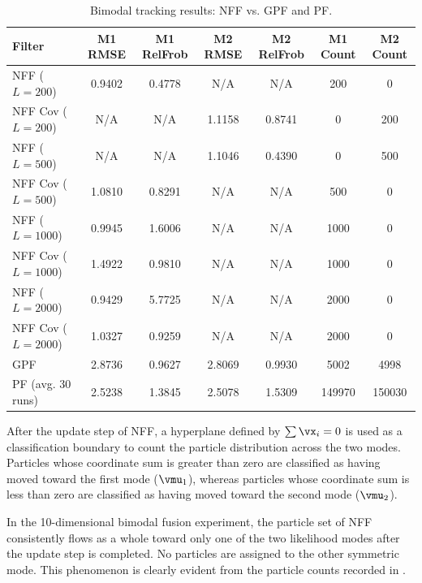 \begin{table}[ht]
	\footnotesize
	\setlength{\tabcolsep}{3pt}
	
	\begin{tabularx}{\textwidth}{|X|c|c|c|c|c|c|}
		\hline
		\textbf{Filter} & \textbf{M1 RMSE} & \textbf{M1 RelFrob} & \textbf{M2 RMSE} & \textbf{M2 RelFrob} & \textbf{M1 Count} & \textbf{M2 Count} \\ \hline
		\makecell[l]{NFF\\($L=200$)} & 0.9402 & 0.4778 & N/A & N/A & 200 & 0 \\ \hline
		\makecell[l]{NFF Cov\\($L=200$)} & N/A & N/A & 1.1158 & 0.8741 & 0 & 200 \\ \hline
		\makecell[l]{NFF\\($L=500$)} & N/A & N/A & 1.1046 & 0.4390 & 0 & 500 \\ \hline
		\makecell[l]{NFF Cov\\($L=500$)} & 1.0810 & 0.8291 & N/A & N/A & 500 & 0 \\ \hline
		\makecell[l]{NFF\\($L=1000$)} & 0.9945 & 1.6006 & N/A & N/A & 1000 & 0 \\ \hline
		\makecell[l]{NFF Cov\\($L=1000$)} & 1.4922 & 0.9810 & N/A & N/A & 1000 & 0 \\ \hline
		\makecell[l]{NFF\\($L=2000$)} & 0.9429 & 5.7725 & N/A & N/A & 2000 & 0 \\ \hline
		\makecell[l]{NFF Cov\\($L=2000$)} & 1.0327 & 0.9259 & N/A & N/A & 2000 & 0 \\ \hline
		GPF & 2.8736 & 0.9627 & 2.8069 & 0.9930 & 5002 & 4998 \\ \hline
		PF (avg. 30 runs) & 2.5238 & 1.3845 & 2.5078 & 1.5309 & 149970 & 150030 \\ \hline
	\end{tabularx}
	\caption{Bimodal tracking results: NFF vs. GPF and PF.}
	\label{tab:multimodal_results}
\end{table}

After the update step of NFF, a hyperplane defined by $\sum \vx_i = 0$ is used as a classification boundary to count the particle distribution across the two modes. Particles whose coordinate sum is greater than zero are classified as having moved toward the first mode ($\vmu_1$), whereas particles whose coordinate sum is less than zero are classified as having moved toward the second mode ($\vmu_2$).

In the 10-dimensional bimodal fusion experiment, the particle set of NFF consistently flows as a whole toward only one of the two likelihood modes after the update step is completed. No particles are assigned to the other symmetric mode. This phenomenon is clearly evident from the particle counts recorded in .
\clearpage
